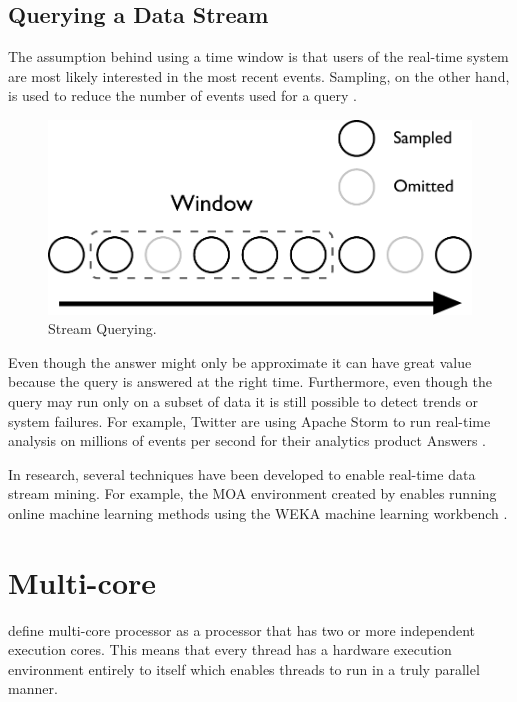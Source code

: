 \documentclass[bsc,logo,frontabs,twoside,singlespacing,normalheadings,parskip]{infthesis}\usepackage[]{graphicx}\usepackage[]{color}
\begin{document}
\subsection{Querying a Data Stream}

The assumption behind using a time window is that users of the real-time system are most likely interested in the most recent events. Sampling, on the other hand, is used to reduce the number of events used for a query \citep{Gaber:2005:MDS:1083784.1083789}.

\begin{figure}[!htb]
	\centering
	\includegraphics[scale=0.5]{pdf/stream.pdf}
	\caption{Stream Querying.}
	\label{fig:stream}
\end{figure}

Even though the answer might only be approximate it can have great value because the query is answered at the right time. Furthermore, even though the query may run only on a subset of data it is still possible to detect trends or system failures. For example, Twitter are using Apache Storm to run real-time analysis on millions of events per second for their analytics product Answers \citep{Solovey}.

In research, several techniques have been developed to enable real-time data stream mining. For example, the MOA environment created by \citet{Bifet:2010:MMO:1756006.1859903} enables running online machine learning methods using the WEKA machine learning workbench \citep{Holmes1994}.

\section{Multi-core}
\label{sec:multicore}

\textcite{akhter2006multi} define multi-core processor as a processor that has two or more independent execution cores. This means that every thread has a hardware execution environment entirely to itself which enables threads to run in a truly parallel manner.
\end{document}
